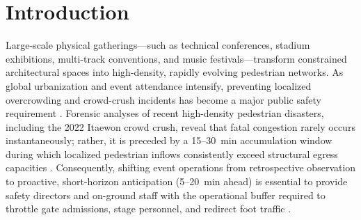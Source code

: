 \documentclass[conference,a4paper]{IEEEtran}
\begin{document}
\section{Introduction}
\label{sec:intro}
Large-scale physical gatherings---such as technical conferences, stadium exhibitions, multi-track conventions, and music festivals---transform constrained architectural spaces into high-density, rapidly evolving pedestrian networks. As global urbanization and event attendance intensify, preventing localized overcrowding and crowd-crush incidents has become a major public safety requirement \cite{hoogendoorn2004, liang2024}. Forensic analyses of recent high-density pedestrian disasters, including the 2022 Itaewon crowd crush, reveal that fatal congestion rarely occurs instantaneously; rather, it is preceded by a 15--30~min accumulation window during which localized pedestrian inflows consistently exceed structural egress capacities \cite{liang2024, kim2026}. Consequently, shifting event operations from retrospective observation to proactive, short-horizon anticipation (5--20~min ahead) is essential to provide safety directors and on-ground staff with the operational buffer required to throttle gate admissions, stage personnel, and redirect foot traffic \cite{daamen2026, yasufuku2024}.
\end{document}
